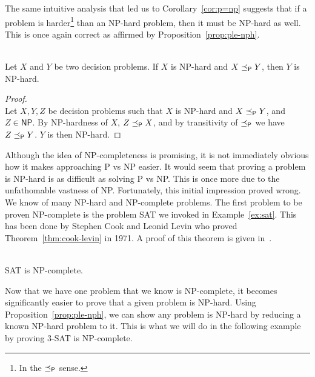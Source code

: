 The same intuitive analysis that led us to Corollary~\ref{cor:p=np} suggests that if a problem is harder\footnote{In the \(\preceq_\textsf{P}\) sense.} than an \textsf{NP}-hard problem, then it must be \textsf{NP}-hard as well. This is once again correct as affirmed by Proposition~\ref{prop:ple-nph}.

\begin{proposition}\ \\
    \label{prop:ple-nph}
    Let \(X\) and \(Y\) be two decision problems. If \(X\) is \textsf{NP}-hard and \(X\preceq_\textsf{P} Y\), then \(Y\) is \textsf{NP}-hard.
\end{proposition}

\begin{proof}\ \\
    Let \(X, Y, Z\) be decision problems such that \(X\) is \textsf{NP}-hard and \(X\preceq_\textsf{P} Y\), and \(Z \in\textsf{NP}\). By  \textsf{NP}-hardness of \(X\), \(Z \preceq_\textsf{P} X\), and by transitivity of \(\preceq_\textsf{P}\) we have \(Z \preceq_\textsf{P} Y\). \(Y\) is then \textsf{NP}-hard.
\end{proof}

Although the idea of \textsf{NP}-completeness is promising, it is not immediately obvious how it makes approaching \textsf{P} vs \textsf{NP} easier. It would seem that proving a problem is \textsf{NP}-hard is as difficult as solving \textsf{P} vs \textsf{NP}. This is once more due to the unfathomable vastness of \textsf{NP}. Fortunately, this initial impression proved wrong. We know of many \textsf{NP}-hard and \textsf{NP}-complete problems. The first problem to be proven \textsf{NP}-complete is the problem \textsf{SAT} we invoked in Example~\ref{ex:sat}. This has been done by Stephen Cook and Leonid Levin who proved Theorem~\ref{thm:cook-levin} in 1971. A proof of this theorem is given in~\cite{langages-formels}.

\begin{theorem}\ \\
    \label{thm:cook-levin}
    \textsf{SAT} is \textsf{NP}-complete.
\end{theorem}

Now that we have one problem that we know is \textsf{NP}-complete, it becomes significantly easier to prove that a given problem is \textsf{NP}-hard. Using Proposition~\ref{prop:ple-nph}, we can show any problem is \textsf{NP}-hard by reducing a known \textsf{NP}-hard problem to it. This is what we will do in the following example by proving 3-\textsf{SAT} is \textsf{NP}-complete.

